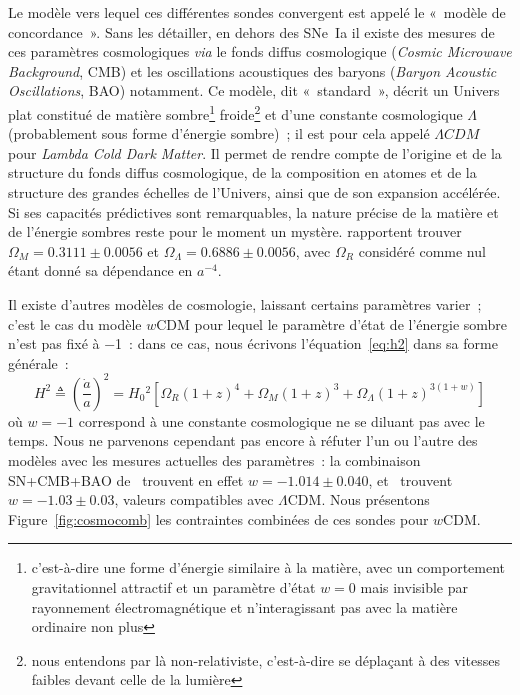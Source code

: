 \documentclass[../main/main.tex]{subfiles}
\begin{document}
Le modèle vers lequel ces différentes sondes convergent est appelé le «~modèle
de concordance~». Sans les détailler, en dehors des SNe~Ia il existe des mesures
de ces paramètres cosmologiques \textit{via} le fonds diffus cosmologique
(\textit{Cosmic Microwave Background}, CMB) et les oscillations acoustiques des
baryons (\textit{Baryon Acoustic Oscillations}, BAO) notamment. Ce modèle, dit
«~standard~», décrit un Univers plat constitué de matière
sombre\footnote{c'est-à-dire une forme d'énergie similaire à la matière, avec un
    comportement gravitationnel attractif et un paramètre d'état $w=0$ mais
    invisible par rayonnement électromagnétique et n'interagissant pas avec la
matière ordinaire non plus} froide\footnote{nous entendons par là
    non-relativiste, c'est-à-dire se déplaçant à des vitesses faibles devant
celle de la lumière} et d'une constante cosmologique $\Lambda$ (probablement
sous forme d'énergie sombre)~; il est pour cela appelé $\Lambda CDM$ pour
\textit{Lambda Cold Dark Matter}. Il permet de rendre compte de l'origine et
de la structure du fonds diffus cosmologique, de la composition en atomes et
de la structure des grandes échelles de l'Univers, ainsi que de son
expansion accélérée. Si ses capacités prédictives sont remarquables, la
nature précise de la matière et de l'énergie sombres reste pour le moment un
mystère. \cite{planck2018} rapportent trouver $\Omega_M = \num{0.3111} \pm
\num{0.0056}$ et $\Omega_\Lambda = \num{0.6886} \pm \num{0.0056}$, avec
$\Omega_R$ considéré comme nul étant donné sa dépendance en $a^{-4}$.

Il existe d'autres modèles de cosmologie, laissant certains paramètres varier~;
c'est le cas du modèle $w$CDM pour lequel le paramètre d'état de l'énergie
sombre n'est pas fixé à \num{-1}~: dans ce cas, nous écrivons
l'équation~\ref{eq:h2} dans sa forme générale~:
\begin{equation}\label{eq:h2w}
    H^2 \triangleq \left( \frac{\dot{a}}{a} \right)^2 =
    H_0{}^2 \left[ \Omega_R \left( 1+z \right)^4 +
        \Omega_M \left( 1+z \right)^3 +
    \Omega_\Lambda \left( 1+z \right)^{3(1+w)} \right]
\end{equation}
où $w=-1$ correspond à une constante cosmologique ne se diluant pas avec le
temps. Nous ne parvenons cependant pas encore à réfuter l'un ou l'autre des
modèles avec les mesures actuelles des paramètres~: la combinaison SN+CMB+BAO
de~\cite{scolnic2018} trouvent en effet $w = \num{-1.014}\pm\num{0.040}$,
et~\cite{planck2018} trouvent $w = \num{-1.03}\pm\num{0.03}$, valeurs
compatibles avec $\Lambda$CDM. Nous présentons Figure~\ref{fig:cosmocomb} les
contraintes combinées de ces sondes pour $w$CDM.
\end{document}
